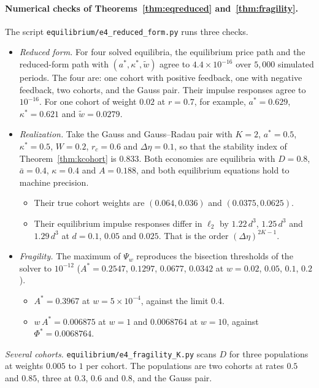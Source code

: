 \paragraph{Numerical checks of Theorems~\ref{thm:eqreduced} and~\ref{thm:fragility}.} The script \nolinkurl{equilibrium/e4_reduced_form.py} runs three checks.
\begin{itemize}[itemsep=1pt,topsep=2pt]
\item \emph{Reduced form.} For four solved equilibria, the equilibrium price path and the reduced-form path with $(a^*,\kappa^*,\tilde w)$ agree to $4.4\times10^{-16}$ over $5{,}000$ simulated periods. The four are: one cohort with positive feedback, one with negative feedback, two cohorts, and the Gauss pair. Their impulse responses agree to $10^{-16}$. For one cohort of weight $0.02$ at $r=0.7$, for example, $a^*=0.629$, $\kappa^*=0.621$ and $\tilde w=0.0279$.
\item \emph{Realization.} Take the Gauss and Gauss--Radau pair with $K=2$, $a^*=0.5$, $\kappa^*=0.5$, $W=0.2$, $r_c=0.6$ and $\Delta\eta=0.1$, so that the stability index of Theorem~\ref{thm:kcohort} is $0.833$. Both economies are equilibria with $D=0.8$, $\bar a=0.4$, $\kappa=0.4$ and $A=0.188$, and both equilibrium equations hold to machine precision.
 \begin{itemize}[itemsep=1pt,topsep=2pt]
 \item Their true cohort weights are $(0.064,0.036)$ and $(0.0375,0.0625)$.
 \item Their equilibrium impulse responses differ in $\ell_2$ by $1.22\,d^3$, $1.25\,d^3$ and $1.29\,d^3$ at $d=0.1$, $0.05$ and $0.025$. That is the order $(\Delta\eta)^{2K-1}$.
 \end{itemize}
\item \emph{Fragility.} The maximum of $\Psi_w$ reproduces the bisection thresholds of the solver to $10^{-12}$ ($A^*=0.2547$, $0.1297$, $0.0677$, $0.0342$ at $w=0.02$, $0.05$, $0.1$, $0.2$).
 \begin{itemize}[itemsep=1pt,topsep=2pt]
 \item $A^*=0.3967$ at $w=5\times10^{-4}$, against the limit $0.4$.
 \item $w\,A^*=0.006875$ at $w=1$ and $0.0068764$ at $w=10$, against $\Phi^*=0.0068764$.
 \end{itemize}
\end{itemize}
\emph{Several cohorts.} \nolinkurl{equilibrium/e4_fragility_K.py} scans $D$ for three populations at weights $0.005$ to $1$ per cohort. The populations are two cohorts at rates $0.5$ and $0.85$, three at $0.3$, $0.6$ and $0.8$, and the Gauss pair.

